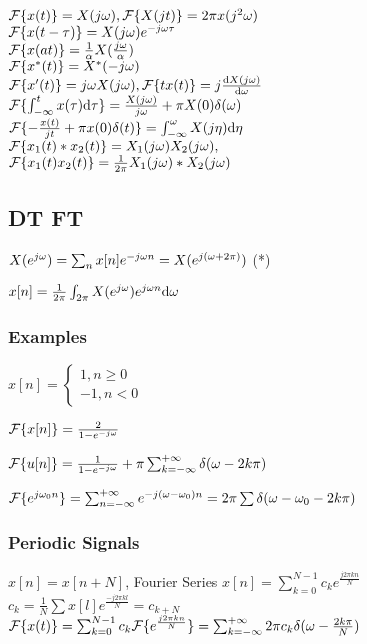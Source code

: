 $\mathcal{F}\{x(t)\} = X(j\omega), \mathcal{F}\{X(jt)\} = 2\pi x(j^2\omega)$\\
$\mathcal{F}\{x(t-\tau)\} = X(j\omega) e^{-j\omega\tau}$\\
$\mathcal{F}\{x(at)\} = \frac{1}{\alpha}X(\frac{j\omega}{\alpha})$\\
$\mathcal{F}\{x^*(t)\} = X^*(-j\omega)$\\
$\mathcal{F}\{x'(t)\} = j\omega X(j\omega), \mathcal{F}\{tx(t)\} = j\frac{\mathrm{d} X(j\omega)}{\mathrm{d} \omega}$\\
$\mathcal{F}\{\int_{-\infty}^{t} x(\tau) \mathrm{d} \tau\} = \frac{X(j\omega)}{j\omega} +\pi X(0)\delta(\omega)$\\
$\mathcal{F}\{-\frac{x(t)}{jt} +\pi x(0)\delta(t)\} = \int_{-\infty}^{\omega} X(j\eta) \mathrm{d} \eta$\\
$\mathcal{F}\{x_1(t)*x_2(t)\} = X_1(j\omega) X_2(j\omega),$\\
$\mathcal{F}\{x_1(t)x_2(t)\} = \frac{1}{2\pi}X_1(j\omega) * X_2(j\omega)$
\subsection{DT FT}

$X(e^{j\omega}) = \sum_n x[n] e^{-j\omega n} = X(e^{j(\omega + 2\pi)})$ (*)

$x[n] = \frac{1}{2\pi} \int_{2\pi} X(e^{j\omega}) e^{j\omega n} \mathrm{d} \omega$

\subsubsection*{Examples}

$x[n] = \begin{cases} 1, n\ge 0\\-1, n<0\end{cases}$

$\mathcal{F}\{x[n]\}=\frac{2}{1-e^{-j\omega}}$

$\mathcal{F}\{u[n]\}=\frac{1}{1-e^{-j\omega}} + \pi\sum_{k=-\infty}^{+\infty} \delta(\omega - 2k\pi)$

$\mathcal{F}\{e^{j\omega_0n}\} = \sum_{n=-\infty}^{+\infty} e^{-j(\omega-\omega_0)n} = 2\pi\sum \delta(\omega-\omega_0-2k\pi)$

\subsubsection*{Periodic Signals}

$x[n] = x[n+N]$, Fourier Series $x[n] = \sum_{k=0}^{N-1} c_k e^{\frac{j2\pi k n}{N}}$\\
$c_k = \frac{1}{N} \sum x[l] e^{\frac{-j2\pi k l}{N}} = c_{k + N}$\\
$\mathcal{F}\{x(t)\} = \sum_{k = 0}^{N - 1} c_k\mathcal{F}\{e^{\frac{j2\pi kn}{N}}\}=\sum_{k=-\infty}^{+\infty} 2\pi c_k\delta(\omega-\frac{2k\pi}{N})$

